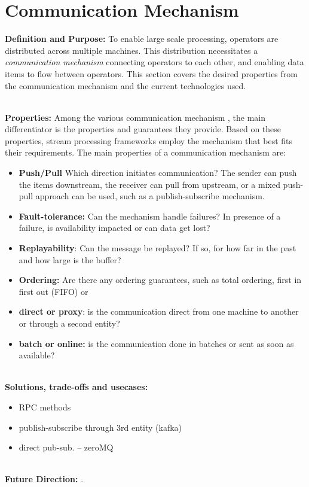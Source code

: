 \section{Communication Mechanism}
\label{sec:communication}


\noindent\textbf{Definition and Purpose:} To enable large scale processing, operators are distributed across multiple machines. This distribution necessitates a \textit{communication mechanism} connecting operators to each other, and enabling data items to flow between operators. This section covers the desired properties from the communication mechanism and the current technologies used.



\noindent \textbf{\\Properties:}
%
Among the various communication mechanism , the main differentiator is the properties and guarantees they provide. 
Based on these properties, stream processing frameworks employ the mechanism that best fits their requirements. The main properties of a communication mechanism are:

\begin{itemize}
	
	
	\item \textbf{Push/Pull} Which direction initiates communication? The sender can push the items downstream, the receiver can pull from upstream, or a mixed push-pull approach can be used, such as a publish-subscribe mechanism. 
	
	
	\item \textbf{Fault-tolerance:} Can the mechanism handle failures? In presence of a failure, is availability impacted or can data get lost? 
	\item \textbf{Replayability}: Can the message be replayed? If so, for how far in the past and how large is the buffer?
	
	\item \textbf{Ordering:} Are there any ordering guarantees, such as total ordering,  first in first out (FIFO) or 
	
	\item \textbf{ direct or proxy}: is the communication direct from one machine to another or through a second entity?
	\item \textbf{ batch or online: } is the communication done in batches or sent as soon as available?
\end{itemize}

\noindent \textbf{\\Solutions, trade-offs and usecases:}

\begin{itemize}
	\item RPC methods
	\item publish-subscribe through 3rd entity (kafka)
	\item direct pub-sub. -- zeroMQ
	
\end{itemize}



\noindent \textbf{\\Future Direction:}  
.




